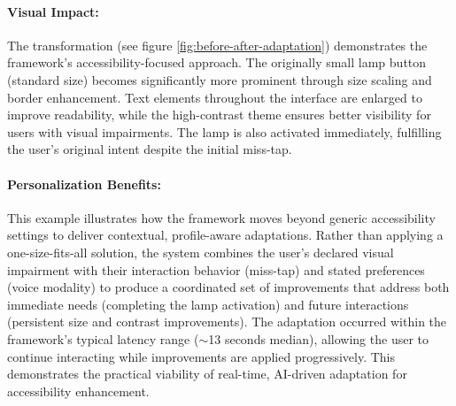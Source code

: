 \paragraph{Visual Impact:} 
The transformation (see figure \ref{fig:before-after-adaptation}) demonstrates the framework's accessibility-focused approach. The originally small lamp button (standard size) becomes significantly more prominent through size scaling and border enhancement. Text elements throughout the interface are enlarged to improve readability, while the high-contrast theme ensures better visibility for users with visual impairments. The lamp is also activated immediately, fulfilling the user's original intent despite the initial miss-tap.

\paragraph{Personalization Benefits:} 
This example illustrates how the framework moves beyond generic accessibility settings to deliver contextual, profile-aware adaptations. Rather than applying a one-size-fits-all solution, the system combines the user's declared visual impairment with their interaction behavior (miss-tap) and stated preferences (voice modality) to produce a coordinated set of improvements that address both immediate needs (completing the lamp activation) and future interactions (persistent size and contrast improvements).
The adaptation occurred within the framework's typical latency range ($\sim$13 seconds median), allowing the user to continue interacting while improvements are applied progressively. This demonstrates the practical viability of real-time, AI-driven adaptation for accessibility enhancement.

